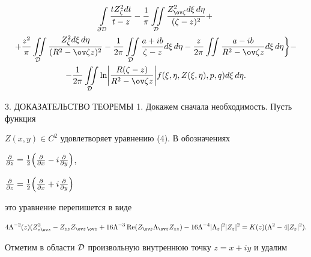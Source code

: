 \begin{thm}
\begin{multline*}
\int\limits_{\partial\cal D} 


\frac{tZ^2_\zeta dt}{t-z}-\frac{1}{\pi}\iintl_{\cal D} 


\frac{Z^2_{\ov\zeta}d\xi\,d\eta}{(\zeta-z)^2}+\\ 


% 


+\frac{z^2}{\pi}\iintl_{\cal D} 


\frac{Z^2_\zeta d\xi\,d\eta}{(R^2-\ov\zeta z)^2}-\frac{1}{2\pi} 


\iintl_{\cal D}\frac{a+ib}{\zeta-z}d\xi\,d\eta-\frac{z}{2\pi} 


\iint\frac{a-ib}{R^2-\ov\zeta z}d\xi\,d\eta \biggr\} -\\ 


% 


-\frac{1}{2\pi}\iintl_{\cal D}\ln\biggl| 


\frac{R(\zeta-z)}{R^2-\ov\zeta z}\biggr| 


f(\xi,\eta,Z(\xi,\eta),p,q)d\xi\,d\eta. 


\end{multline*} 


\end{thm}


 


3. ДОКАЗАТЕЛЬСТВО ТЕОРЕМЫ 1. Докажем сначала необходимость. Пусть функция 


$Z(x,y)\in C^2$ удовлетворяет уравнению (4). В обозначениях 


$\frac{\partial}{\partial z}=\frac{1}{2} 


\Bigl(\frac{\partial}{\partial x}-i\frac{\partial}{\partial y}\Bigr)$, 


$\frac{\partial}{\partial z}=\frac{1}{2} 


\Bigl(\frac{\partial}{\partial x}+i\frac{\partial}{\partial y}\Bigr)$


это уравнение перепишется в виде 


\begin{equation} 


4\Lambda^{-2}(z)(Z^2_{z\ov z}-Z_{zz}Z_{\ov z\,\ov z}+16\Lambda^{-3} 


\re(Z_{\ov z}\Lambda_{\ov z}Z_{zz})- 


16\Lambda^{-4}|\Lambda_z|^2|Z_z|^2=K(z) 


(\Lambda^2-4|Z_z|^2). 


\end{equation} 


Отметим в области $\cal D$ произвольную внутреннюю точку $z=x+iy$ и удалим 


